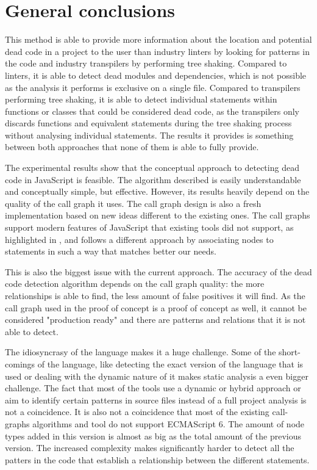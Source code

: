 \documentclass{uvamscse}
\begin{document}
\section{General conclusions}
This method is able to provide more information about the location and potential dead code in a project to the user than industry linters by looking for patterns in the code and industry transpilers by performing tree shaking. Compared to linters, it is able to detect dead modules and dependencies, which is not possible as the analysis it performs is exclusive on a single file. Compared to transpilers performing tree shaking, it is able to detect individual statements within functions or classes that could be considered dead code, as the transpilers only discards functions and equivalent statements during the tree shaking process without analysing individual statements. The results it provides is something between both approaches that none of them is able to fully provide.

The experimental results show that the conceptual approach to detecting dead code in JavaScript is feasible. The algorithm described is easily understandable and conceptually simple, but effective. However, its results heavily depend on the quality of the call graph it uses. The call graph  design is also a fresh implementation based on new ideas different to the existing ones. The call graphs support modern features of JavaScript that existing tools did not support, as highlighted in \cite{metaCallGraphs}, and follows a different approach by associating nodes to statements in such a way that matches better our needs.

This is also the biggest issue with the current approach. The accuracy of the dead code detection algorithm depends on the call graph quality: the more relationships is able to find, the less amount of false positives it will find. As the call graph used in the proof of concept is a proof of concept as well, it cannot be considered "production ready" and there are patterns and relations that it is not able to detect.

The idiosyncrasy of the language makes it a huge challenge. Some of the short-comings of the language, like detecting the exact version of the language that is used or dealing with the dynamic nature of it makes static analysis a even bigger challenge. The fact that most of the tools use a dynamic or hybrid approach or aim to identify certain patterns in source files instead of a full project analysis is not a coincidence. It is also not a coincidence that most of the existing call-graphs algorithms and tool do not support ECMAScript 6. The amount of node types added in this version is almost as big as the total amount of the previous version. The increased complexity makes significantly harder to detect all the patters in the code that establish a relationship between the different statements.
\end{document}
